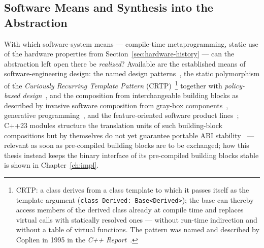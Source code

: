 \begin{nurlang}
\section{Software Means and Synthesis into the Abstraction}\label{sec:software-means}
With which software-system means --- compile-time metaprogramming, static use of the hardware
properties from Section~\ref{sec:hardware-history} --- can the abstraction left open there be
\emph{realized}? Available are the
established means of software-engineering design: the named design
patterns~\cite{gamma1994patterns}, the static polymorphism of the \emph{Curiously Recurring Template
Pattern} (CRTP)~\cite{coplien1995crtp,vandevoorde2017templates}\footnote{CRTP\@: a class derives from a
class template to which it passes itself as the template argument (\texttt{class Derived: Base<Derived>});
the base can thereby access members of the derived class already at compile time and replaces virtual
calls with statically resolved ones --- without run-time indirection and without a table of virtual
functions. The pattern was named and described by Coplien in 1995 in the
\emph{C++ Report}~\cite{coplien1995crtp}.} together with \emph{policy-based
design}~\cite{alexandrescu2001modern}, and the composition from
interchangeable building blocks as described by invasive software composition from gray-box
components~\cite{assmann2003invasive}, generative programming~\cite{czarnecki2000generative}, and the
feature-oriented software product lines~\cite{apel2013feature,batory1992hierarchical}; C++23 modules
structure the translation units of such building-block compositions but by themselves do not yet guarantee portable ABI
stability~\cite{wg21_modules_abi} --- relevant as soon as pre-compiled building blocks are to be
exchanged; how this thesis instead keeps the binary interface of its pre-compiled building blocks stable
is shown in Chapter~\ref{ch:impl}.


\end{nurlang}
